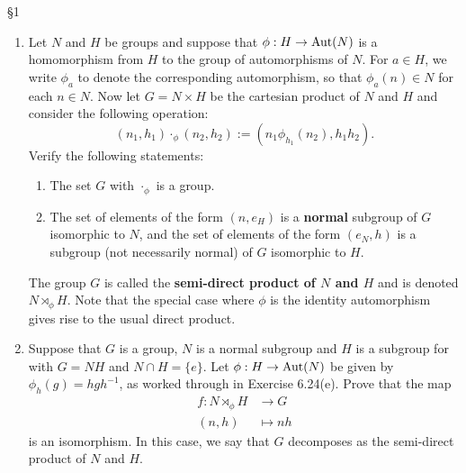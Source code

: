 \documentclass{homework}
\begin{document}
\begin{problem}{\S 1}
  \begin{enumerate}[label=(\alph*)]
    \item Let $N$ and $H$ be groups and suppose that $\phi:H\to \operatorname{Aut}(N)$ is a homomorphism from $H$
      to the group of automorphisms of $N$. For $a\in H$, we write $\phi_a$ to denote the
      corresponding automorphism, so that $\phi_a(n)\in N$ for each $n\in N$. Now let $G=N\times H$
      be the cartesian product of $N$ and $H$ and consider the following operation: \[
        (n_1,h_1)\cdot _{\phi}(n_2,h_2):=(n_1\phi_{h_1}(n_2),h_1h_2)
      .\] Verify the following statements:
      \begin{enumerate}
        \item The set $G$ with $\cdot _\phi$ is a group.
        \item The set of elements of the form $(n,e_H)$ is a \textbf{normal} subgroup of $G$
          isomorphic to $N$, and the set of elements of the form $(e_N,h)$ is a subgroup (not
          necessarily normal) of $G$ isomorphic to $H$.
      \end{enumerate}
      The group $G$ is called the \textbf{semi-direct product of $N$ and $H$} and is denoted
      $N\rtimes_\phi H$. Note that the special case where $\phi$ is the identity automorphism gives
      rise to the usual direct product.

    \item Suppose that $G$ is a group, $N$ is a normal subgroup and $H$ is a subgroup for with
      $G=NH$ and $N \cap H=\{ e \}$. Let $\phi:H\to \operatorname{Aut}(N)$ be given by $\phi_h(g)=hgh^{-1}$, as
      worked through in Exercise 6.24(e). Prove that the map \begin{align*}
        f: N\rtimes_\phi H &\longrightarrow G \\
        (n,h) &\longmapsto nh
      \end{align*} is an isomorphism. In this case, we say that $G$ decomposes as the semi-direct
      product of $N$ and $H$.
  \end{enumerate}
\end{problem}
\end{document}
